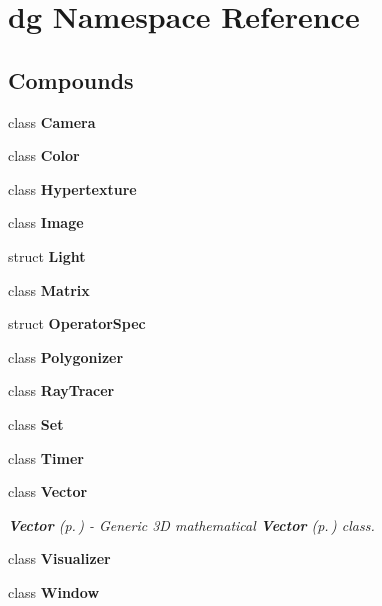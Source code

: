 \section{dg Namespace Reference}
\label{namespacedg}


\subsection*{Compounds}
\begin{CompactItemize}
\item 
class {\bf Camera}
\item 
class {\bf Color}
\item 
class {\bf Hypertexture}
\item 
class {\bf Image}
\item 
struct {\bf Light}
\item 
class {\bf Matrix}
\item 
struct {\bf Operator\-Spec}
\item 
class {\bf Polygonizer}
\item 
class {\bf Ray\-Tracer}
\item 
class {\bf Set}
\item 
class {\bf Timer}
\item 
class {\bf Vector}
\begin{CompactList}\small\item\em {\bf Vector} {\rm (p.\,\pageref{classdg_1_1Vector})} - Generic 3D mathematical {\bf Vector} {\rm (p.\,\pageref{classdg_1_1Vector})} class.\item\end{CompactList}\item 
class {\bf Visualizer}
\item 
class {\bf Window}
\end{CompactItemize}
